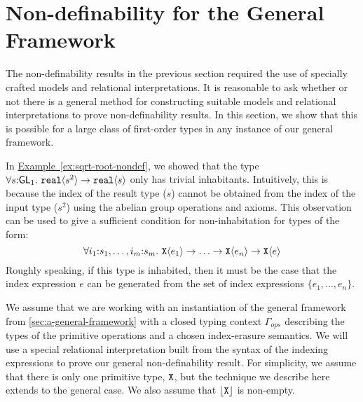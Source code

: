 \documentclass{sigplanconf}
\newcommand{\SynGL}[1]{\mathsf{GL}_#1}
\newcommand{\tyPrim}[2]{\textup{\texttt{#1}}\langle #2 \rangle}
\newcommand{\tyPrimNm}[1]{\textup{\texttt{#1}}}
\newcommand{\tySem}[1]{\left\lfloor #1 \right\rfloor}
\newcommand{\exref}[1]{\hyperref[#1]{Example~\ref*{#1}}}
\theoremstyle{examplestyle}
\theoremstyle{restatementstyle}
\begin{document}
\section{Non-definability for the General Framework}
\label{sec:general-nondef}

The non-definability results in the previous section required the use
of specially crafted models and relational interpretations. It is
reasonable to ask whether or not there is a general method for
constructing suitable models and relational interpretations to prove
non-definability results. In this section, we show that this is
possible for a large class of first-order types in any instance of our
general framework.

In \exref{ex:sqrt-root-nondef}, we showed that the type $\forall s
\mathord: \SynGL{1}.~\tyPrim{real}{s^2} \to \tyPrim{real}{s}$ only has
trivial inhabitants. Intuitively, this is because the index of the
result type ($s$) cannot be obtained from the index of the input type
($s^2$) using the abelian group operations and axioms. This
observation can be used to give a sufficient condition for
non-inhabitation for types of the form:
\begin{displaymath}
  \forall i_1\mathord:s_1,\ldots,i_m\mathord:s_m.~\tyPrim{X}{e_1} \to \ldots \to \tyPrim{X}{e_n} \to \tyPrim{X}{e}
\end{displaymath}
Roughly speaking, if this type is inhabited, then it must be the case
that the index expression $e$ can be generated from the set of index
expressions $\{e_1,...,e_n\}$.

We assume that we are working with an instantiation of the general
framework from \autoref{sec:a-general-framework} with a closed typing
context $\Gamma_{\mathit{ops}}$ describing the types of the primitive
operations and a chosen index-erasure semantics. We will use a special
relational interpretation built from the syntax of the indexing
expressions to prove our general non-definability result. For
simplicity, we assume that there is only one primitive type,
$\tyPrimNm{X}$, but the technique we describe here extends to the
general case. We also assume that $\tySem{\tyPrimNm{X}}$ is non-empty.
\end{document}
